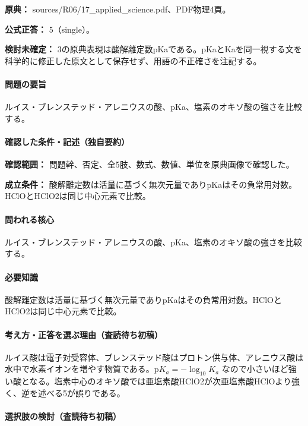 \noindent\textbf{原典：} sources/R06/17\_applied\_science.pdf、PDF物理4頁。

\textbf{公式正答：} 5（single）。

\par\textbf{検討未確定：} 3の原典表現は酸解離定数pKaである。pKaとKaを同一視する文を科学的に修正した原文として保存せず、用語の不正確さを注記する。

\paragraph{問題の要旨} ルイス・ブレンステッド・アレニウスの酸、pKa、塩素のオキソ酸の強さを比較する。

\paragraph{確認した条件・記述（独自要約）}\mbox{}\par

\noindent\textbf{確認範囲：} 問題幹、否定、全5肢、数式、数値、単位を原典画像で確認した。\par

\noindent\textbf{成立条件：} 酸解離定数は活量に基づく無次元量でありpKaはその負常用対数。HClOとHClO2は同じ中心元素で比較。\par

\paragraph{問われる核心} ルイス・ブレンステッド・アレニウスの酸、pKa、塩素のオキソ酸の強さを比較する。

\paragraph{必要知識} 酸解離定数は活量に基づく無次元量でありpKaはその負常用対数。HClOとHClO2は同じ中心元素で比較。

\paragraph{考え方・正答を選ぶ理由（査読待ち初稿）} ルイス酸は電子対受容体、ブレンステッド酸はプロトン供与体、アレニウス酸は水中で水素イオンを増やす物質である。\(\mathrm{p}K_a=-\log_{10}K_a\) なので小さいほど強い酸となる。塩素中心のオキソ酸では亜塩素酸HClO2が次亜塩素酸HClOより強く、逆を述べる5が誤りである。

\paragraph{選択肢の検討（査読待ち初稿）}\mbox{}\par

